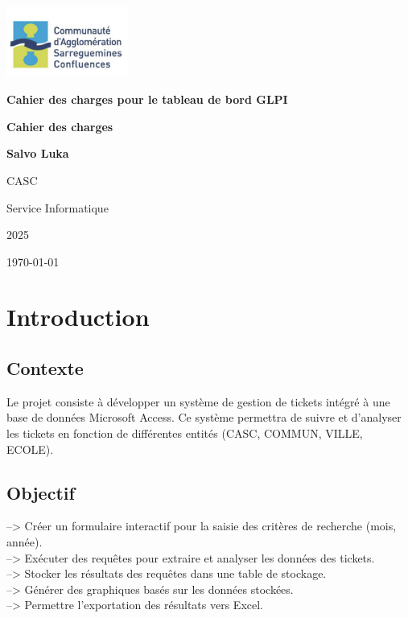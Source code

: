 \documentclass[a4paper,12pt]{article}
\begin{document}
\begin{titlepage}
    \centering


    \vfill  
    \centering
    \includegraphics[width=4cm]{img/logoCASC.png} 

    {\Huge \textbf{Cahier des charges pour le tableau de bord GLPI} \par}

    \vspace{2cm}

    \vspace{2cm} 

    {\Large \textbf{Cahier des charges} \par}
    \vspace{0.5cm}
    {\large \textbf{Salvo Luka} \par}

    \vfill 


    {\large CASC \par}
    {\large Service Informatique \par}
    {\large 2025 \par}

    \vspace{1.5cm}


    {\large \today}
\end{titlepage}


\newpage
\null
\tableofcontents
\newpage


\section{Introduction}
\subsection{Contexte}
Le projet consiste à développer un système de gestion de tickets intégré à une base de données Microsoft Access. Ce système permettra de suivre et d'analyser les tickets en fonction de différentes entités (CASC, COMMUN, VILLE, ECOLE).


\subsection{Objectif}

\noindent  --> Créer un formulaire interactif pour la saisie des critères de recherche (mois, année). \\
\noindent  --> Exécuter des requêtes pour extraire et analyser les données des tickets.\\
\noindent  --> Stocker les résultats des requêtes dans une table de stockage. \\ 
\noindent  --> Générer des graphiques basés sur les données stockées. \\
\noindent  --> Permettre l'exportation des résultats vers Excel.
\end{document}
